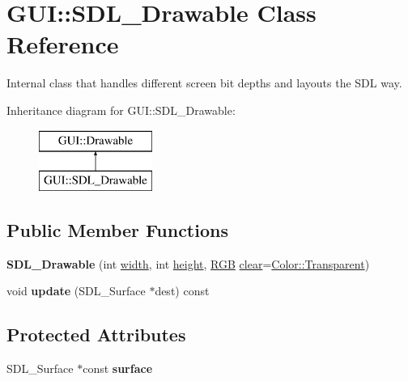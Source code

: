 \hypertarget{classGUI_1_1SDL__Drawable}{\section{G\-U\-I\-:\-:S\-D\-L\-\_\-\-Drawable Class Reference}
\label{classGUI_1_1SDL__Drawable}
}


Internal class that handles different screen bit depths and layouts the S\-D\-L way.  


Inheritance diagram for G\-U\-I\-:\-:S\-D\-L\-\_\-\-Drawable\-:\begin{figure}[H]
\begin{center}
\leavevmode
\includegraphics[height=2.000000cm]{classGUI_1_1SDL__Drawable}
\end{center}
\end{figure}
\subsection*{Public Member Functions}
\begin{DoxyCompactItemize}
\item 
\hypertarget{classGUI_1_1SDL__Drawable_a05cbc3048aa3a0de446f0e71399e9601}{{\bfseries S\-D\-L\-\_\-\-Drawable} (int \hyperlink{classGUI_1_1Drawable_a494b6f1edafb1d03279b43b244883a1e}{width}, int \hyperlink{classGUI_1_1Drawable_a02b7ebcd21396c6de9ee229193540df7}{height}, \hyperlink{namespaceGUI_aeafd135255365f3584da0e982fc79466}{R\-G\-B} \hyperlink{classGUI_1_1Drawable_a7cc6ef04bf37bed0be886b4376c8c173}{clear}=\hyperlink{namespaceGUI_1_1Color_a7ec3cc2d0178f404a31dac73d2048a10}{Color\-::\-Transparent})}\label{classGUI_1_1SDL__Drawable_a05cbc3048aa3a0de446f0e71399e9601}

\item 
\hypertarget{classGUI_1_1SDL__Drawable_a945a91dd1d582db9b49bf63b49cfba3b}{void {\bfseries update} (S\-D\-L\-\_\-\-Surface $\ast$dest) const }\label{classGUI_1_1SDL__Drawable_a945a91dd1d582db9b49bf63b49cfba3b}

\end{DoxyCompactItemize}
\subsection*{Protected Attributes}
\begin{DoxyCompactItemize}
\item 
\hypertarget{classGUI_1_1SDL__Drawable_ab2ec94e55d266125075335197daa376d}{S\-D\-L\-\_\-\-Surface $\ast$const {\bfseries surface}}\label{classGUI_1_1SDL__Drawable_ab2ec94e55d266125075335197daa376d}

\end{DoxyCompactItemize}


